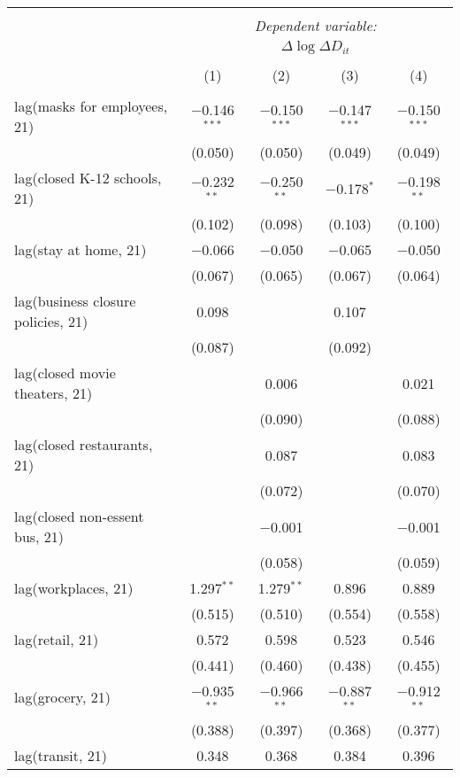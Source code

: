 \begin{tabular}{@{\extracolsep{1pt}}lcccc} 
\\[-1.8ex]\hline 
\hline \\[-1.8ex] 
 & \multicolumn{4}{c}{\textit{Dependent variable:}} \\ 
\cline{2-5} 
 & \multicolumn{4}{c}{$\Delta \log \Delta D_{it}$} \\ 
\\[-1.8ex] & (1) & (2) & (3) & (4)\\ 
\hline \\[-1.8ex] 
 lag(masks for employees, 21) & $-$0.146$^{***}$ & $-$0.150$^{***}$ & $-$0.147$^{***}$ & $-$0.150$^{***}$ \\ 
  & (0.050) & (0.050) & (0.049) & (0.049) \\ 
  lag(closed K-12 schools, 21) & $-$0.232$^{**}$ & $-$0.250$^{**}$ & $-$0.178$^{*}$ & $-$0.198$^{**}$ \\ 
  & (0.102) & (0.098) & (0.103) & (0.100) \\ 
  lag(stay at home, 21) & $-$0.066 & $-$0.050 & $-$0.065 & $-$0.050 \\ 
  & (0.067) & (0.065) & (0.067) & (0.064) \\ 
  lag(business closure policies, 21) & 0.098 &  & 0.107 &  \\ 
  & (0.087) &  & (0.092) &  \\ 
  lag(closed movie theaters, 21) &  & 0.006 &  & 0.021 \\ 
  &  & (0.090) &  & (0.088) \\ 
  lag(closed restaurants, 21) &  & 0.087 &  & 0.083 \\ 
  &  & (0.072) &  & (0.070) \\ 
  lag(closed non-essent bus, 21) &  & $-$0.001 &  & $-$0.001 \\ 
  &  & (0.058) &  & (0.059) \\ 
  lag(workplaces, 21) & 1.297$^{**}$ & 1.279$^{**}$ & 0.896 & 0.889 \\ 
  & (0.515) & (0.510) & (0.554) & (0.558) \\ 
  lag(retail, 21) & 0.572 & 0.598 & 0.523 & 0.546 \\ 
  & (0.441) & (0.460) & (0.438) & (0.455) \\ 
  lag(grocery, 21) & $-$0.935$^{**}$ & $-$0.966$^{**}$ & $-$0.887$^{**}$ & $-$0.912$^{**}$ \\ 
  & (0.388) & (0.397) & (0.368) & (0.377) \\ 
  lag(transit, 21) & 0.348 & 0.368 & 0.384 & 0.396 \\ 

\end{tabular}
